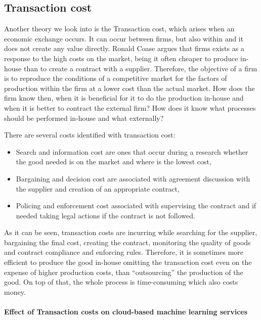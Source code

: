 \subsection{Transaction cost} \label{sec:transaction-cost}

Another theory we look into is the Transaction cost, which arises when an economic exchange occurs. It can occur between firms, but also within and it does not create any value directly. Ronald Coase argues that firms exists as a response to the high costs on the market, being it often cheaper to produce in-house than to create a contract with a supplier. Therefore, the objective of a firm is to reproduce the conditions of a competitive market for the factors of production within the firm at a lower cost than the actual market. How does the firm know then, when it is beneficial for it to do the production in-house and when it is better to contract the external firm? How does it know what processes should be performed in-house and what externally?

There are several costs identified with transaction cost:
\begin{itemize}[noitemsep]
    \item Search and information cost are ones that occur during a research whether the good needed is on the market and where is the lowest cost,
    \item Bargaining and decision cost are associated with agreement discussion with the supplier and creation of an appropriate contract,
    \item Policing and enforcement cost associated with supervising the contract and if needed taking legal actions if the contract is not followed.
\end{itemize}
As it can be seen, transaction costs are incurring while searching for the supplier, bargaining the final cost, creating the contract, monitoring the quality of goods and contract compliance and enforcing rules. Therefore, it is sometimes more efficient to produce the good in-house omitting the transaction cost even on the expense of higher production costs, than ``outsourcing'' the production of the good. On top of that, the whole process is time-consuming which also costs money.

\paragraph{Effect of Transaction costs on cloud-based machine learning services}

